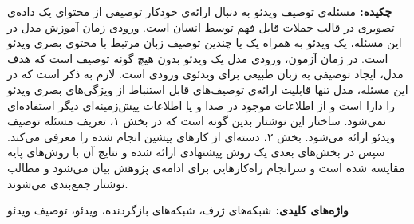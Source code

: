 {\bf {چکيده: }}
مسئله‌ی توصیف ویدئو‌
به دنبال ارائه‌ی خودکار توصیفی از محتوای یک داده‌ی تصویری در قالب جملات قابل فهم توسط انسان است.
ورودی زمان آموزش مدل در این مسئله، یک ویدئو به همراه یک یا چندین توصیف زبان مرتبط با محتوی بصری ویدئو است.
در زمان آزمون، ورودی مدل یک ویدئو بدون هیچ گونه توصیف است که هدف مدل، ایجاد توصیفی به زبان طبیعی برای ویدئو‌ی ورودی است.
لازم به ذکر است که در این مسئله، مدل تنها قابلیت ارائه‌ی توصیف‌های قابل استنباط از ویژگی‌های بصری ویدئو را دارا است و از اطلاعات موجود در صدا و یا اطلاعات پیش‌زمینه‌ای دیگر استفاده‌ای نمی‌شود. 
ساختار این نوشتار بدین گونه است که در بخش ۱، تعریف مسئله توصیف ویدئو ارائه می‌شود. بخش ۲، دسته‌ای از کارهای پیشین انجام شده را معرفی می‌کند. سپس در بخش‌های بعدی یک روش‌ پیشنهادی ارائه شده و نتایج آن با روش‌های پایه مقایسه شده است و سرانجام راه‌کارهایی برای ادامه‌ی پژوهش بیان می‌شود و مطالب نوشتار جمع‌بندی می‌شوند.

{\bf  { واژه‌های کلیدی: }}
شبکه‌های ژرف، شبکه‌های بازگردنده، ویدئو، توصیف ویدئو

